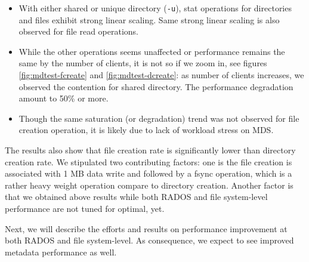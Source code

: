 \begin{itemize}

\item With either shared or unique directory (\verb!-u!), stat
operations for directories and files exhibit strong linear scaling. Same strong
linear scaling is also observed for file read operations. 

\item While the other operations seems unaffected or performance remains the
same by the number of clients, it is not so if we zoom in, see
figures \ref{fig:mdtest-fcreate} and \ref{fig:mdtest-dcreate}:  as number of clients
increases, we observed the contention for shared directory. The performance
degradation amount to 50\% or more.

\item Though the same saturation (or degradation) trend was not observed for
file creation operation, it is likely due to lack of workload stress on MDS.

\end{itemize}


The results also show that file creation rate is significantly lower than
directory creation rate. We stipulated two contributing factors: one is the file
creation is associated with 1 MB data write and followed by a fsync operation,
which is a rather heavy weight operation compare to directory creation. Another
factor is that we obtained above results while both RADOS and file
system-level performance are not tuned for optimal, yet. 

Next, we will describe the efforts and results on performance improvement at
both RADOS and file system-level. As consequence, we expect to see improved
metadata performance as well.


